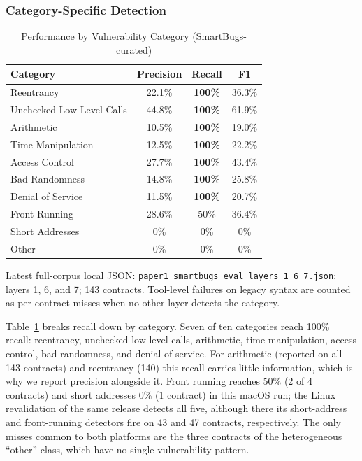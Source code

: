 \documentclass[conference]{IEEEtran}
\begin{document}
\subsubsection{Category-Specific Detection}

\begin{table}[htbp]
\caption{Performance by Vulnerability Category (SmartBugs-curated)}
\label{tab:categories}
\centering
\begin{tabular}{@{}lccc@{}}
\toprule
\textbf{Category} & \textbf{Precision} & \textbf{Recall} & \textbf{F1} \\
\midrule
Reentrancy & 22.1\% & \textbf{100\%} & 36.3\% \\
Unchecked Low-Level Calls & 44.8\% & \textbf{100\%} & 61.9\% \\
Arithmetic & 10.5\% & \textbf{100\%} & 19.0\% \\
Time Manipulation & 12.5\% & \textbf{100\%} & 22.2\% \\
Access Control & 27.7\% & \textbf{100\%} & 43.4\% \\
Bad Randomness & 14.8\% & \textbf{100\%} & 25.8\% \\
Denial of Service & 11.5\% & \textbf{100\%} & 20.7\% \\
Front Running & 28.6\% & 50\% & 36.4\% \\
Short Addresses & 0\% & 0\% & 0\% \\
Other & 0\% & 0\% & 0\% \\
\bottomrule
\end{tabular}

\vspace{2pt}
\footnotesize{Latest full-corpus local JSON: \texttt{paper1\_smartbugs\_eval\_layers\_1\_6\_7.json}; layers 1, 6, and 7; 143 contracts. Tool-level failures on legacy syntax are counted as per-contract misses when no other layer detects the category.}
\end{table}

Table~\ref{tab:categories} breaks recall down by category. Seven of ten categories reach 100\% recall: reentrancy, unchecked low-level calls, arithmetic, time manipulation, access control, bad randomness, and denial of service. For arithmetic (reported on all 143 contracts) and reentrancy (140) this recall carries little information, which is why we report precision alongside it. Front running reaches 50\% (2 of 4 contracts) and short addresses 0\% (1 contract) in this macOS run; the Linux revalidation of the same release detects all five, although there its short-address and front-running detectors fire on 43 and 47 contracts, respectively. The only misses common to both platforms are the three contracts of the heterogeneous ``other'' class, which have no single vulnerability pattern.
\end{document}
